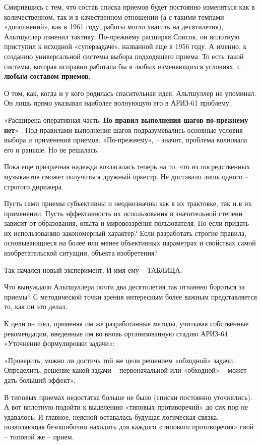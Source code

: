 \documentclass[11pt,a4paper]{article}
\begin{document}
Смирившись с тем, что состав списка приемов будет постоянно изменяться как в
количественном, так и в качественном отношении (а с такими темпами
«дополнений», как в 1961 году, работы могло хватить на десятилетия),
Альтшуллер изменил тактику. По-прежнему расширяя Список, он вплотную приступил
к исходной «суперзадаче», названной еще в 1956 году. А именно, к созданию
универсальной системы выбора подходящего приема. То есть такой системы,
которая исправно работала бы в любых изменяющихся условиях, с \textbf{любым
  составом приемов}.

О том, как, когда и у кого родилась спасительная идея, Альтшуллер не упоминал.
Он лишь прямо указывал наиболее волнующую его в АРИЗ-61 проблему:

«Расширена оперативная часть. \textbf{Но правил выполнения шагов по-прежнему
  нет}» \cite{Altshuller1986a}. Под правилами выполнения шагов подразумевались
основные условия выбора и применения приемов. «По-прежнему», -- значит,
проблема волновала его и раньше. Но не решалась.

Пока еще призрачная надежда возлагалась теперь на то, что из посредственных
музыкантов сможет получиться дружный оркестр. Не доставало лишь одного --
строгого дирижера.

Пусть сами приемы субъективны и неоднозначны как в их трактовке, так и в их
применении. Пусть эффективность их использования в значительной степени
зависит от образования, опыта и мировоззрения пользователя. Но если придать их
использованию закономерный характер? Если разработать строгие правила,
основывающиеся на более или менее объективных параметрах и свойствах самой
изобретательской ситуации, объекта изобретения?

Так начался новый эксперимент. И имя ему -- ТАБЛИЦА.

Что вынуждало Альтшуллера почти два десятилетия так отчаянно бороться за
приемы? С методической точки зрения интересным более важным представляется то,
как он это делал.

К цели он шел, применяя им же разработанные методы, учитывая собственные
рекомендации, введенные им во вновь организованную стадию АРИЗ-64 «Уточнение
формулировки задачи«:

«Проверить, можно ли достичь той же цели решением «обходной» задачи.
Определить, решение какой задачи -- первоначальной или «обходной» -- может
дать больший эффект».

В типовых приемах недостатка больше не было (списки постоянно уточнялись). А
вот вплотную подойти к выделению «типовых противоречий» до сих пор не
удавалось. И главное, неясной оставалась будущая логическая связка,
позволяющая безошибочно находить для каждого «типового противоречия» свой --
типовой же -- прием.
\end{document}
